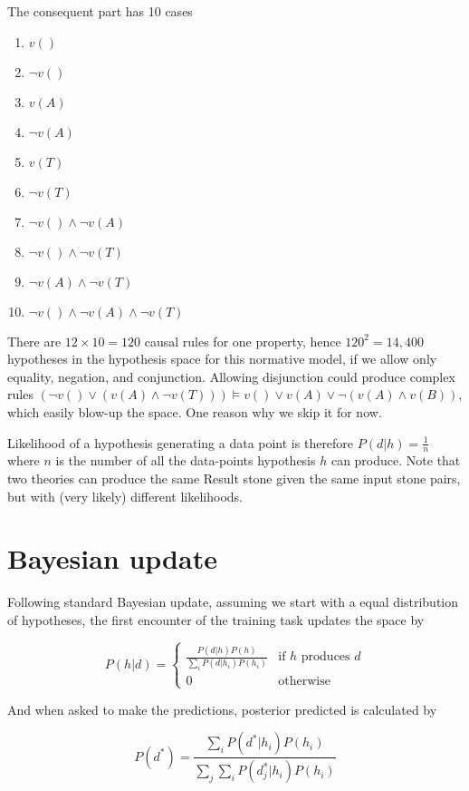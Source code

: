 \documentclass{article}
\begin{document}
The consequent part has 10 cases

\begin{enumerate}
\item $v()$
\item $\neg v()$
\item $v(A)$
\item $\neg v(A)$
\item $v(T)$
\item $\neg v(T)$
\item $\neg v() \wedge \neg v(A)$
\item $\neg v() \wedge \neg v(T)$
\item $\neg v(A) \wedge \neg v(T)$
\item $\neg v() \wedge \neg v(A) \wedge \neg v(T)$
\end{enumerate}

There are $12 \times 10 = 120$ causal rules for one property, hence $120^2 = 14,400$ hypotheses in the hypothesis space for this normative model, if we allow only equality, negation, and conjunction. Allowing disjunction could produce complex rules $(\neg v() \vee (v(A) \wedge \neg v(T))) \models v() \vee v(A) \vee \neg (v(A) \wedge v(B))$, which easily blow-up the space. One reason why we skip it for now.

Likelihood of a hypothesis generating a data point is therefore $P(d|h) = \frac{1}{n}$ where $n$ is the number of all the data-points hypothesis $h$ can produce. Note that two theories can produce the same Result stone given the same input stone pairs, but with (very likely) different likelihoods. 

\section*{Bayesian update}

Following standard Bayesian update, assuming we start with a equal distribution of hypotheses, the first encounter of the training task updates the space by

\begin{equation}
P(h|d) =
\begin{cases}
\frac{P(d|h)P(h)}{\sum_iP(d|h_i)P(h_i)} & \text{if } h \text{ produces } d \\
0 & \text{otherwise}
\end{cases}
\end{equation}

And when asked to make the predictions, posterior predicted is calculated by

\[
P(d^*) = \frac{\sum_iP(d^*|h_i)P(h_i)}{\sum_j\sum_iP(d_j^*|h_i)P(h_i)}
\]
\end{document}
